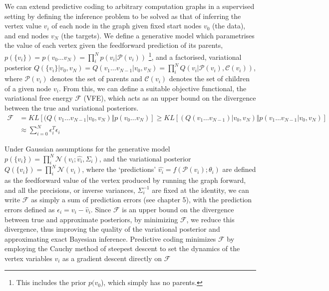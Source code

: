 We can extend predictive coding to arbitrary computation graphs in a supervised setting by defining the inference problem to be solved as that of inferring the vertex value $v_i$ of each node in the graph given fixed start nodes $v_0$ (the data), and end nodes $v_N$ (the targets). We define a generative model which parametrises the value of each vertex given the feedforward prediction of its parents, $p(\{v_i\}) = p(v_0 \dots v_N) = \prod_i^N p(v_i | \mathcal{P}(v_i) )$ \footnote{This includes the prior $p(v_0$), which simply has no parents.}, and a factorised, variational posterior $Q(\{v_i\} | v_0, v_N) = Q(v_1 \dots v_{N-1} | v_0, v_N) = \prod_i^N Q(v_i | \mathcal{P}(v_i), \mathcal{C}(v_i))$, where $\mathcal{P}(v_i)$ denotes the set of parents and $\mathcal{C}(v_i)$ denotes the set of children of a given node $v_i$. From this, we can define a suitable objective functional, the variational free energy $\mathcal{F}$ (VFE), which acts as an upper bound on the divergence between the true and variational posteriors.
\begin{equation}
\begin{aligned}
    \mathcal{F} &= KL[(Q(v_1 \dots v_{N-1} | v_0, v_N) \Vert p(v_0 \dots v_N)] \geq  KL[(Q(v_1 \dots v_{N-1}) | v_0, v_N) \Vert p(v_1 \dots v_{N-1}| v_0, v_N)] \\
    &\approx \sum_{i=0}^N \epsilon_i^T \epsilon_i 
\end{aligned}
\end{equation}

Under Gaussian assumptions for the generative model $p(\{v_i\}) = \prod_i^N \mathcal{N}(v_i ; \hat{v_i}, \Sigma_i)$, and the variational posterior $Q(\{v_i\}) = \prod_i^N \mathcal{N}(v_i)$, where the `predictions' $\hat{v_i} = f(\mathcal{P}(v_i); \theta_i)$ are defined as the feedforward value of the vertex produced by running the graph forward, and all the precisions, or inverse variances, $\Sigma^{-1}_i$ are fixed at the identity, we can write $\mathcal{F}$ as simply a sum of prediction errors (see chapter 5), with the prediction errors defined as $\epsilon_i = v_i - \hat{v}_i$. Since $\mathcal{F}$ is an upper bound on the divergence between true and approximate posteriors, by minimizing $\mathcal{F}$, we reduce this divergence, thus improving the quality of the variational posterior and approximating exact Bayesian inference. Predictive coding minimizes $\mathcal{F}$ by employing the Cauchy method of steepest descent to set the dynamics of the vertex variables $v_i$ as a gradient descent directly on $\mathcal{F}$

